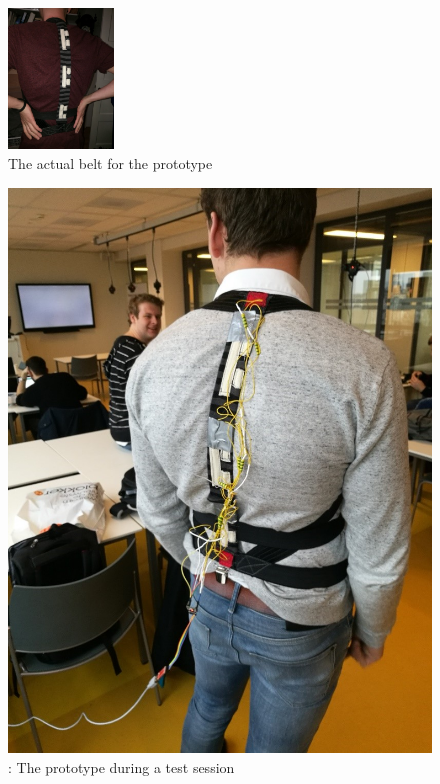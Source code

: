 \documentclass[sigconf]{acmart}
\begin{document}
\begin{figure}[h]
\centering
\includegraphics[width=0.25\textwidth, scale=0.5]{Tom_Prototype.jpg}
\caption{The actual belt for the prototype}
\end{figure}

\begin{figure}[h]
\centering
\includegraphics[scale=0.5]{Mattijs_Prototype.jpg}
\caption{: The prototype during a test session}
\end{figure}
\end{document}
